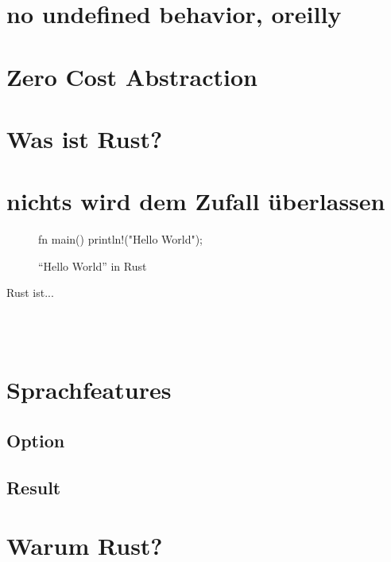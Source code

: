 \section{no undefined behavior, oreilly}
\section{Zero Cost Abstraction}

\section{Was ist Rust?}


\section{nichts wird dem Zufall überlassen}


\begin{wrapfigure}{r}{.5\textwidth}
	\begin{rustc}
		fn main() {
			println!("Hello World");
		}
	\end{rustc}
	\caption{\enquote{Hello World} in Rust}
	\label{fig:rust:hello_world}
\end{wrapfigure}



Rust ist...

 \\
 \\
\cite{rust:orly_programming}

\FloatBarrier
\section{Sprachfeatures}
\subsection{Option}
\subsection{Result}

\section{Warum Rust?}

